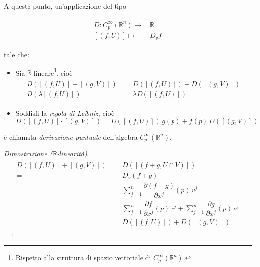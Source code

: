 A questo punto, un'applicazione del tipo

\begin{align}
	\begin{split}
		D : C_{p}^{\infty}(\mathbb{R}^{n}) \to& \, \mathbb{R}\\
		[(f,U)] \mapsto& \, D_{v} f
	\end{split}
\end{align}

tale che:

\begin{itemize}
	\item Sia $ \mathbb{R} $-lineare\footnote{%
		Rispetto alla struttura di spazio vettoriale di $ C_{p}^{\infty}(\mathbb{R}^{n}) $.%
	}, cioè
		\begin{align}
			\begin{split}
				D ([(f,U)] + [(g,V)]) =& \, D ([(f,U)]) + D ([(g,V)])\\
				D (\lambda [(f,U)]) =& \, \lambda D ([(f,U)])
			\end{split}
		\end{align}
	
	\item Soddisfi la \textit{regola di Leibniz}, cioè
		\begin{equation}
			D ([(f,U)] \cdot [(g,V)]) = D ([(f,U)]) \, g(p) + f(p) \, D ([(g,V)])
		\end{equation}
\end{itemize}

è chiamata \textit{derivazione puntuale} dell'algebra $ C_{p}^{\infty}(\mathbb{R}^{n}) $.

\begin{proof}[Dimostrazione ($ \mathbb{R} $-linearità)]
	\begin{align}
		\begin{split}
			D ([(f,U)] + [(g,V)]) =& \, D ([(f+g,U \cap V)])\\
			=& \, D_{v} (f+g)\\
			=& \, \sum_{j=1}^{n} \dfrac{\partial (f+g)}{\partial x^{j}} (p) \, v^{j}\\
			=& \, \sum_{j=1}^{n} \dfrac{\partial f}{\partial x^{j}} (p) \, v^{j} + \sum_{j=1}^{n} \dfrac{\partial g}{\partial x^{j}} (p) \, v^{j}\\
			=& \, D ([(f,U)]) + D ([(g,V)])
		\end{split}
	\end{align}
\end{proof}

